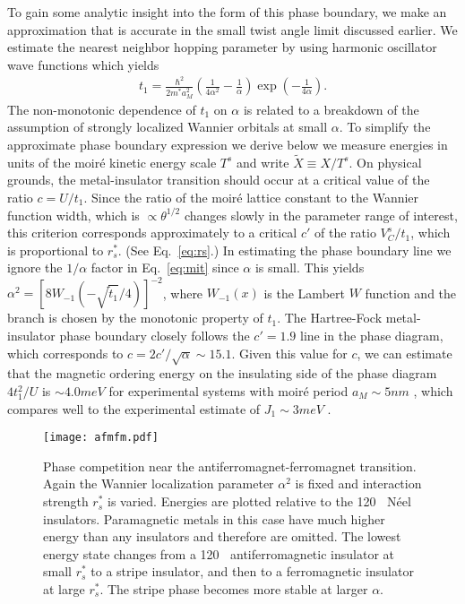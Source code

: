\documentclass[%
 reprint,
 superscriptaddress,
 amsmath,amssymb,
 aps,
 prx,
 floatfix,
]{revtex4-2}
\newcommand{\<}{\langle}
\renewcommand{\>}{\rangle}
\renewcommand{\(}{\left(}
\renewcommand{\)}{\right)}
\renewcommand{\[}{\left[}
\renewcommand{\]}{\right]}
\DeclareMathOperator{\degree}{^{\circ}}
\begin{document}
To gain some analytic insight into the form of this phase boundary, we make an approximation that is accurate 
in the small twist angle limit discussed earlier.   We estimate the nearest neighbor hopping parameter by using harmonic oscillator wave functions
which yields
\begin{align}
    t_1 = \frac{\hbar^2}{2m^*a_M^2}\(\frac{1}{4\alpha^2}-\frac{1}{\alpha}\)\exp\(-\frac{1}{4\alpha}\).\label{eq:mit}
\end{align}
The non-monotonic dependence of $t_1$ on $\alpha $ is related to a breakdown of the assumption of strongly localized 
Wannier orbitals at small $\alpha$.  To simplify the approximate phase boundary expression we derive below 
we measure energies in units of the moir\'e kinetic energy scale $T^s$ and write $\tilde{X} \equiv X/T^s$. 
On physical grounds, the metal-insulator transition should occur at a critical value of the ratio $c = U/t_1$. 
Since the ratio of the moir\'e lattice constant to the Wannier function width, which is $\propto \theta^{1/2}$ 
changes slowly in the parameter range of interest, this criterion corresponds 
approximately to a critical $c'$ of the ratio $V_C^s/t_1$, which is proportional to $r_s^*$. (See Eq.~\eqref{eq:rs}.) 
In estimating the phase boundary line we ignore the $1/\alpha$ factor in Eq.~\eqref{eq:mit} since $\alpha$ is small. 
This yields $\alpha^2 = [8W_{-1}(-\sqrt{\tilde{t}_1}/4)]^{-2}$, where $W_{-1}(x)$ is the Lambert $W$ function and the branch is chosen by the monotonic property of $t_1$.  The Hartree-Fock metal-insulator phase boundary closely follows the $c' = 1.9$ line in the phase diagram, 
which corresponds to $c=2c'/\sqrt{\alpha}\sim15.1$. 
Given this value for $c$, we can estimate that the magnetic ordering energy 
on the insulating side of the phase diagram $4t_1^2/U$ is $\sim 4.0 meV$ for 
experimental systems with moir\'e period $a_M\sim 5nm$ \cite{mak2021continuousMIT,dean2021quantumcritical}, 
which compares well to the experimental estimate of $J_1\sim3meV$ \cite{mak2021continuousMIT}. 

\begin{figure}
\centering
\texttt{[image: afmfm.pdf]}
\caption{Phase competition near the antiferromagnet-ferromagnet transition. Again the Wannier localization parameter $\alpha^2$ is fixed and interaction strength $r_s^*$ is varied. Energies are plotted relative to the 120$\degree$ N\'eel insulators. Paramagnetic metals in this case have much higher energy than any insulators and therefore are omitted. The lowest energy state changes from a 120$\degree$ antiferromagnetic insulator at small $r_s^*$ to a stripe insulator, and then to a ferromagnetic insulator at large $r_s^*$. The stripe phase becomes more stable at larger $\alpha$.}
\label{fig:fm}
\end{figure}
\end{document}

